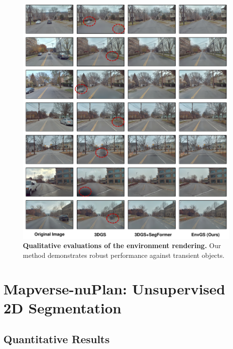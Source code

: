 \begin{figure}[ht]
\begin{center}
\centerline{\includegraphics[width=\columnwidth]{figs_compressed/envrendering-supp_compressed.pdf}}
\caption{\textbf{Qualitative evaluations of the environment rendering.} Our method demonstrates robust performance against transient objects.}
\label{fig:rendering-appendix}
\end{center}
\vspace{-10mm}
\end{figure}


\clearpage


\section{Mapverse-nuPlan: Unsupervised 2D Segmentation}
\label{sec:seg-nuplan-app}
\subsection{Quantitative Results}

